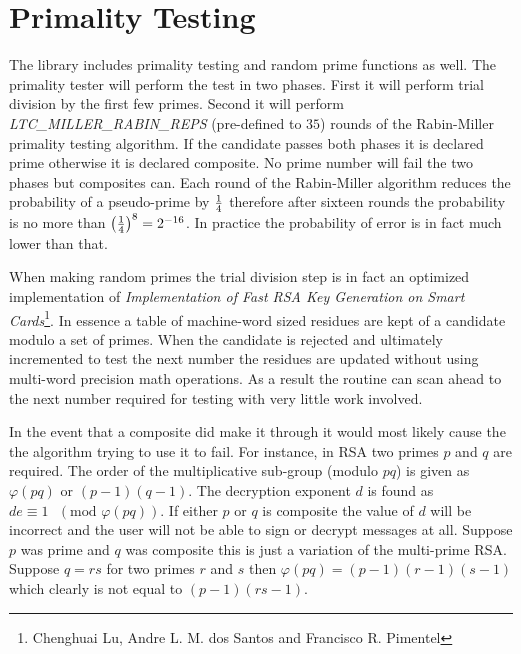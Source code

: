 \documentclass[synpaper]{book}
\def\phi{\varphi}
\newcommand{\mysection}[1]    %
	{                   %
	\section{#1}
   \markboth{\textsf{www.libtom.net}}{\thesection ~ {#1}}
	}
\begin{document}
\mysection{Primality Testing}
The library includes primality testing and random prime functions as well.  The primality tester will perform the test in
two phases.  First it will perform trial division by the first few primes.  Second it will perform \textit{LTC\_MILLER\_RABIN\_REPS} (pre-defined to $35$) rounds of the
Rabin-Miller primality testing algorithm.  If the candidate passes both phases it is declared prime otherwise it is declared
composite.  No prime number will fail the two phases but composites can.  Each round of the Rabin-Miller algorithm reduces
the probability of a pseudo-prime by $1 \over 4$ therefore after sixteen rounds the probability is no more than
$\left ( { 1 \over 4 } \right )^{8} = 2^{-16}$.  In practice the probability of error is in fact much lower than that.

When making random primes the trial division step is in fact an optimized implementation of \textit{Implementation of Fast RSA Key Generation on Smart Cards}\footnote{Chenghuai Lu, Andre L. M. dos Santos and Francisco R. Pimentel}.
In essence a table of machine-word sized residues are kept of a candidate modulo a set of primes.  When the candidate
is rejected and ultimately incremented to test the next number the residues are updated without using multi-word precision
math operations.  As a result the routine can scan ahead to the next number required for testing with very little work
involved.

In the event that a composite did make it through it would most likely cause the the algorithm trying to use it to fail.  For
instance, in RSA two primes $p$ and $q$ are required.  The order of the multiplicative sub-group (modulo $pq$) is given
as $\phi(pq)$ or $(p - 1)(q - 1)$.  The decryption exponent $d$ is found as $de \equiv 1\mbox{ }(\mbox{mod } \phi(pq))$.  If either $p$ or $q$ is composite the value of $d$ will be incorrect and the user
will not be able to sign or decrypt messages at all.  Suppose $p$ was prime and $q$ was composite this is just a variation of
the multi-prime RSA.  Suppose $q = rs$ for two primes $r$ and $s$ then $\phi(pq) = (p - 1)(r - 1)(s - 1)$ which clearly is
not equal to $(p - 1)(rs - 1)$.
\end{document}
